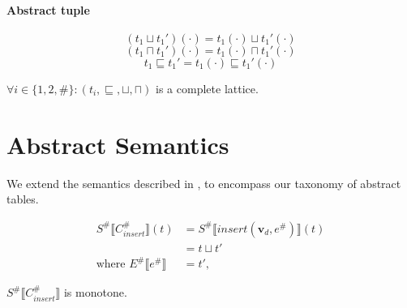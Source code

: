 \paragraph{Abstract tuple}

\begin{equation*}
    (t_1 \sqcup t_1')(\cdot) = t_1(\cdot) \sqcup t_1'(\cdot)
\end{equation*}
\begin{equation*}
    (t_1 \sqcap t_1')(\cdot) = t_1(\cdot) \sqcap t_1'(\cdot)
\end{equation*}
\begin{equation*}
    t_1 \sqsubseteq t_1' = t_1(\cdot) \sqsubseteq t_1'(\cdot)
\end{equation*}

\begin{theorem}
    $\forall i \in \{1, 2, \#\} : (t_i, \sqsubseteq, \sqcup, \sqcap)$ is a complete lattice.
\end{theorem}

\section{Abstract Semantics}

We extend the semantics described in \cite{halder_abstract_2012}, to encompass our taxonomy of abstract tables.

\begin{align*}
    S^\# \llbracket C_{insert}^\# \rrbracket (t) &= S^\# \llbracket insert(\mathbf{v}_d, e^\#) \rrbracket (t) \\
    &= t \sqcup t' \\
    \text{where } E^\# \llbracket e^\# \rrbracket &= t',
\end{align*}

\begin{lemma}
    $S^\# \llbracket C_{insert}^\# \rrbracket$ is monotone.
\end{lemma}




